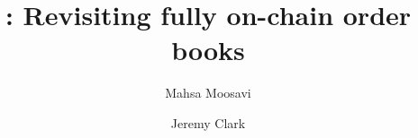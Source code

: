 \documentclass[envcountsect]{llncs}
\begin{document}
\frontmatter
\mainmatter

\title{\Large \bf \cm: Revisiting fully on-chain order books}


\author{Mahsa Moosavi \and Jeremy Clark}


\maketitle











\clearpage



\clearpage
\appendix

\end{document}
